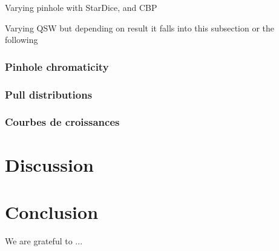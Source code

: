 \documentclass[printer]{aa}
\begin{document}
Varying pinhole with StarDice, and CBP

Varying QSW but depending on result it falls into this subsection or the following

\subsubsection{Pinhole chromaticity}

\subsubsection{Pull distributions}

\subsubsection{Courbes de croissances}


\section{Discussion}

\section{Conclusion}
\label{sec:conclusion}



\begin{acknowledgements}
We are grateful to ...
\end{acknowledgements}





\appendix
\end{document}
